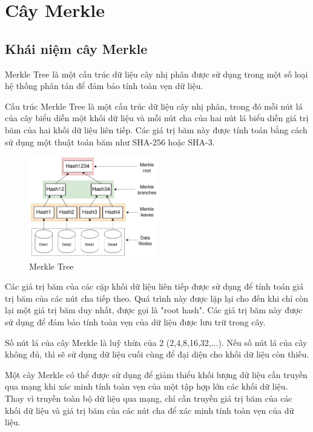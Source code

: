 \section{Cây Merkle}
\subsection{Khái niệm cây Merkle}

Merkle Tree là một cấu trúc dữ liệu cây nhị phân được sử dụng trong một số loại hệ thống phân 
tán để đảm bảo tính toàn vẹn dữ liệu. 

Cấu trúc Merkle Tree là một cấu trúc dữ liệu cây nhị phân, trong đó mỗi nút lá của cây biểu diễn
một khối dữ liệu và mỗi nút cha của hai nút lá biểu diễn giá trị băm của hai khối dữ 
liệu liên tiếp. Các giá trị băm này được tính toán bằng cách sử dụng một thuật toán băm như 
SHA-256 hoặc SHA-3.


\begin{figure}[h]
    \centering
    \includegraphics[width=0.5\textwidth]{images/Merkle_Tree.png}
    \caption{Merkle Tree }
    \label{fig:merkle_tree}
\end{figure}

Các giá trị băm của các cặp khối dữ liệu liên tiếp được sử dụng để tính toán giá trị băm của 
các nút cha tiếp theo. Quá trình này được lặp lại cho đến khi chỉ còn lại một giá trị băm duy 
nhất, được gọi là "root hash". Các giá trị băm này được sử dụng để đảm bảo tính toàn vẹn của 
dữ liệu được lưu trữ trong cây.

Số nút lá của cây Merkle là luỹ thừa của 2 (2,4,8,16,32,...). Nếu số nút lá của cây không
đủ, thì sẽ sử dụng dữ liệu cuối cùng để đại diện cho khối dữ liệu còn thiếu.



Một cây Merkle có thể được sử dụng để giảm thiểu khối lượng dữ liệu cần truyền qua mạng khi 
xác minh tính toàn vẹn của một tập hợp lớn các khối dữ liệu. Thay vì truyền toàn bộ dữ liệu qua
mạng, chỉ cần truyền giá trị băm của các khối dữ liệu và giá trị băm của các nút cha để xác minh tính toàn vẹn của dữ liệu.

